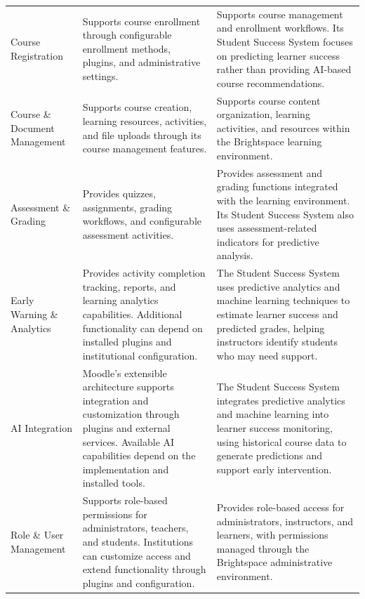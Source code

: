 \begin{xltabular}{\textwidth}{>{\bfseries}p{2.8cm} X X}
    \addlinespace

    Course Registration &
    Supports course enrollment through configurable enrollment methods,
    plugins, and administrative settings. &
    Supports course management and enrollment workflows. Its Student
    Success System focuses on predicting learner success rather than
    providing AI-based course recommendations. \\

    \addlinespace

    Course \& Document Management &
    Supports course creation, learning resources, activities, and
    file uploads through its course management features. &
    Supports course content organization, learning activities, and
    resources within the Brightspace learning environment. \\

    \addlinespace

    Assessment \& Grading &
    Provides quizzes, assignments, grading workflows, and configurable
    assessment activities. &
    Provides assessment and grading functions integrated with the
    learning environment. Its Student Success System also uses
    assessment-related indicators for predictive analysis. \\

    \addlinespace

    Early Warning \& Analytics &
    Provides activity completion tracking, reports, and learning
    analytics capabilities. Additional functionality can depend on
    installed plugins and institutional configuration. &
    The Student Success System uses predictive analytics and machine
    learning techniques to estimate learner success and predicted
    grades, helping instructors identify students who may need support. \\

    \addlinespace

    AI Integration & 
    Moodle's extensible architecture supports integration and
    customization through plugins and external services. Available
    AI capabilities depend on the implementation and installed tools. &
    The Student Success System integrates predictive analytics and
    machine learning into learner success monitoring, using historical
    course data to generate predictions and support early intervention. \\


    \addlinespace

    Role \& User Management &
    Supports role-based permissions for administrators, teachers, and
    students. Institutions can customize access and extend functionality
    through plugins and configuration. &
    Provides role-based access for administrators, instructors, and
    learners, with permissions managed through the Brightspace
    administrative environment. \\



\end{xltabular}

